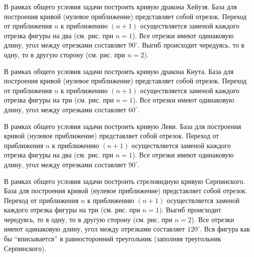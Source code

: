 
\begin{zztask}
В рамках общего условия задачи построить кривую дракона Хейуэя. База для 
построения кривой (нулевое приближение) представляет собой отрезок. Переход 
от приближения $n$ к приближению $(n+1)$ осуществляется заменой каждого 
отрезка фигуры на два (см. рис. при $n=1$). Все отрезки 
имеют одинаковую длину, угол между отрезками составляет $90^\circ$.
Выгиб происходит чередуясь, то в одну, то в другую сторону (см. рис. при $n=2$).
\par
\end{zztask}



\begin{zztask}
В рамках общего условия задачи построить кривую дракона Кнута. База для 
построения кривой (нулевое приближение) представляет собой отрезок. Переход 
от приближения $n$ к приближению $(n+1)$ осуществляется заменой каждого 
отрезка фигуры на три (см. рис. при $n=1$). Все отрезки 
имеют одинаковую длину, угол между отрезками составляет $60^\circ$.
\par
\end{zztask}


\begin{zztask}
В рамках общего условия задачи построить кривую Леви. База для 
построения кривой (нулевое приближение) представляет собой отрезок. Переход 
от приближения $n$ к приближению $(n+1)$ осуществляется заменой каждого 
отрезка фигуры на два (см. рис. при $n=1$). Все отрезки 
имеют одинаковую длину, угол между отрезками составляет $90^\circ$.
\par
\end{zztask}


\begin{zztask}
В рамках общего условия задачи построить стреловидную кривую Серпинского.
База для построения кривой (нулевое приближение) представляет собой отрезок.
Переход от приближения $n$ к приближению $(n+1)$ осуществляется заменой каждого 
отрезка фигуры на три (см. рис. при $n=1$). 
Выгиб происходит чередуясь, то в одну, то в другую сторону (см. рис. при $n=2$).
Все отрезки 
имеют одинаковую длину, угол между отрезками составляет $120^\circ$. Вся фигура
как бы ``вписывается'' в равносторонний треугольник (заполняя треугольник 
Серпинского).
\par
\end{zztask}

